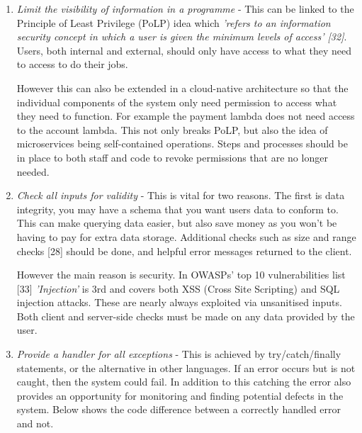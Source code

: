   \begin{enumerate}
    \label{sec:PoLP}
    \item \textit{Limit the visibility of information in a programme} - This can be linked to the Principle of Least Privilege (PoLP) idea which 
    \textit{'refers to an information security concept in which a user is given the minimum levels of access' [32]}. Users, both internal and external, 
    should only have access to what they need to access to do their jobs. 

    However this can also be extended in a cloud-native architecture so that the individual components of the system only need permission to access what 
    they need to function. For example the payment lambda does not need access to the account lambda. This not only breaks PoLP, but also the idea of
    microservices being self-contained operations. Steps and processes should be in place to both staff and code to revoke permissions that are no
    longer needed.

    \item \textit{Check all inputs for validity} - This is vital for two reasons. The first is data integrity, you may have a schema that you want users
    data to conform to. This can make querying data easier, but also save money as you won't be having to pay for extra data storage. Additional checks such 
    as size and range checks [28] should be done, and helpful error messages returned to the client.
    
    However the main reason is security. In OWASPs' top 10 vulnerabilities list [33] \textit{'Injection'} is 3rd and covers both XSS (Cross Site Scripting) 
    and SQL injection attacks. These are nearly always exploited via unsanitised inputs. Both client and server-side checks must be made on any data
    provided by the user. 

    \item \textit{Provide a handler for all exceptions} - This is achieved by try/catch/finally statements, or the alternative in other languages. If an 
    error occurs but is not caught, then the system could fail. In addition to this catching the error also provides an opportunity for monitoring and 
    finding potential defects in the system. Below shows the code difference between a correctly handled error and not.


\end{enumerate}
